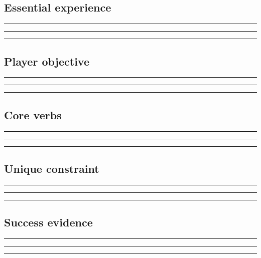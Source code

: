 \documentclass[11pt]{article}
\begin{document}
\subsection{Essential experience}
\noindent\rule{\linewidth}{0.3pt}\par\vspace{0.18in}
\noindent\rule{\linewidth}{0.3pt}\par\vspace{0.18in}
\noindent\rule{\linewidth}{0.3pt}\par\vspace{0.14in}

\subsection{Player objective}
\noindent\rule{\linewidth}{0.3pt}\par\vspace{0.18in}
\noindent\rule{\linewidth}{0.3pt}\par\vspace{0.18in}
\noindent\rule{\linewidth}{0.3pt}\par\vspace{0.14in}

\subsection{Core verbs}
\noindent\rule{\linewidth}{0.3pt}\par\vspace{0.18in}
\noindent\rule{\linewidth}{0.3pt}\par\vspace{0.18in}
\noindent\rule{\linewidth}{0.3pt}\par\vspace{0.14in}

\subsection{Unique constraint}
\noindent\rule{\linewidth}{0.3pt}\par\vspace{0.18in}
\noindent\rule{\linewidth}{0.3pt}\par\vspace{0.18in}
\noindent\rule{\linewidth}{0.3pt}\par\vspace{0.14in}

\subsection{Success evidence}
\noindent\rule{\linewidth}{0.3pt}\par\vspace{0.18in}
\noindent\rule{\linewidth}{0.3pt}\par\vspace{0.18in}
\noindent\rule{\linewidth}{0.3pt}\par\vspace{0.14in}
\end{document}
